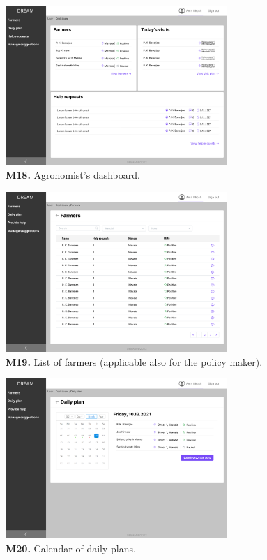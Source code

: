 \begin{figure}[H]
    \centering
    \includegraphics[width=0.75\textwidth]{mockups/Agronomist_Dashboard.png}
    \caption{\textbf{M18.} Agronomist's dashboard.}
\end{figure}

\begin{figure}[H]
    \centering
    \includegraphics[width=0.75\textwidth]{mockups/Agronomist_Dashboard_Farmers.png}
    \caption{\textbf{M19.} List of farmers (applicable also for the policy maker).}
\end{figure}

\begin{figure}[H]
    \centering
    \includegraphics[width=0.75\textwidth]{mockups/Agronomist_Dashboard_Visit plan.png}
    \caption{\textbf{M20.} Calendar of daily plans.}
\end{figure}

